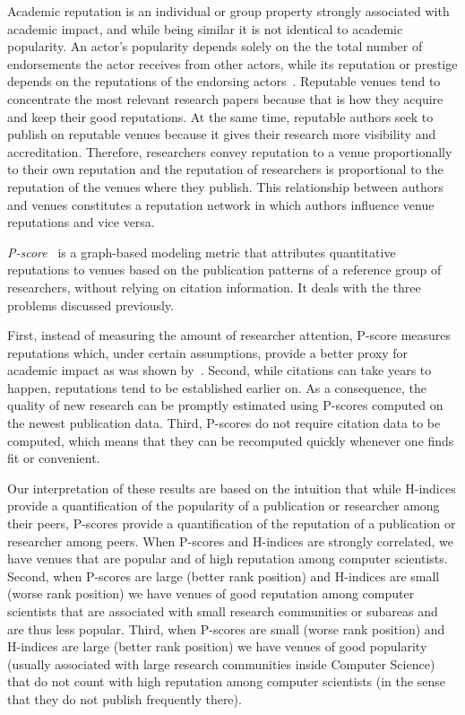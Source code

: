 \documentclass[man,floatsintext]{apa6}
\let \citeA \textcite
\let \cite \parencite
\begin{document}
Academic reputation is an individual or group property strongly associated with 
academic impact, and while being similar it is not identical to academic popularity. An 
actor's popularity depends solely on the the total number of endorsements
the actor receives from other actors, while its reputation or prestige depends on the 
reputations of the endorsing actors~\cite{Bollen2006}. Reputable venues tend to 
concentrate the most relevant research papers 
because that is how they acquire and keep their good reputations. At the same time, 
reputable authors seek to publish on reputable venues because it gives their 
research more visibility and accreditation. Therefore, researchers convey reputation
to a venue proportionally to their own reputation and the reputation of researchers
is proportional to the reputation of the venues where they publish.
This relationship between authors and venues constitutes a reputation network in which 
authors influence venue reputations and vice versa. 

{\em P-score}~\cite{Ribas2015a} is a graph-based modeling metric that attributes quantitative
reputations to venues based on the publication patterns of a reference group of researchers,
without relying on citation information. It deals with the three problems discussed previously. 

First, instead of measuring the amount of researcher attention, P-score measures reputations
which, under certain assumptions, provide a better proxy for academic impact as was shown by~\citeA{Ribas2015a}. Second, while citations can take years to happen, reputations 
tend to be established earlier on. As a consequence, the quality of new research can be 
promptly estimated using P-scores computed on the newest publication data. Third, P-scores do
not require citation data to be computed, which means that they can be recomputed quickly whenever one finds fit or convenient.

Our interpretation of these results are based on the intuition that while H-indices provide a 
quantification of the popularity of a publication or researcher among their peers, P-scores 
provide a quantification of the reputation of a publication or researcher among peers. When
P-scores and H-indices are strongly correlated, we have venues that are popular and of high
reputation among computer scientists. Second, when P-scores are large (better rank position) 
and H-indices are small (worse rank position) we have venues of good reputation among computer
scientists that are associated with small research communities or subareas and are thus less popular. Third, when P-scores
are small (worse rank position) and H-indices are large (better rank position) we have venues of good popularity 
(usually associated with large research communities inside Computer Science) that do not count
with high reputation among computer scientists (in the sense that they do not publish frequently 
there).
\end{document}
